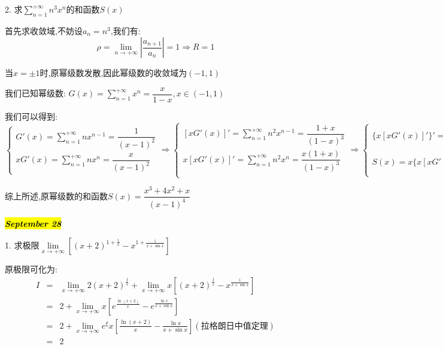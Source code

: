 2. 求$\sum\limits_{n=1}^{+\infty}n^3x^n$的和函数$S(x)$
\begin{solution}

	首先求收敛域,不妨设$a_{n}=n^3$,我们有:  
	$$\rho=\lim\limits_{n\rightarrow +\infty}|\dfrac{a_{n+1}}{a_{n}}|=1\Rightarrow R=1$$
	
	当$x=\pm 1$时,原幂级数发散,因此幂级数的收敛域为$(-1,1)$
	
	我们已知幂级数:  $G(x)=\sum\limits_{n=1}^{+\infty}x^{n}=\dfrac{x}{1-x},x\in(-1,1)$
	
	我们可以得到:  
	$$\left\lbrace
	\begin{array}{l}
		G'(x)=\sum\limits_{n=1}^{+\infty}nx^{n-1}=\dfrac{1}{(x-1)^2}\\
		xG'(x)=\sum\limits_{n=1}^{+\infty}nx^{n}=\dfrac{x}{(x-1)^2}
	\end{array}
	\right.\Rightarrow \left\lbrace
	\begin{array}{l}
		[xG'(x)]'=\sum\limits_{n=1}^{+\infty}n^2x^{n-1}=\dfrac{1+x}{(1-x)^3}\\
		x[xG'(x)]'=\sum\limits_{n=1}^{+\infty}n^2x^{n}=\dfrac{x(1+x)}{(1-x)^3}\\
	\end{array}
	\right.\Rightarrow \left\lbrace
	\begin{array}{l}
		\{x[xG'(x)]'\}'=\sum\limits_{n=1}^{+\infty}n^3x^{n-1}=\dfrac{x^2+4x+1}{(x-1)^4}\\
		S(x)=x\{x[xG'(x)]'\}'=\dfrac{x^3+4x^2+x}{(x-1)^4}
	\end{array}
	\right. $$
	
	综上所述,原幂级数的和函数$S(x)=\dfrac{x^3+4x^2+x}{(x-1)^4}$
\end{solution}

\hl{\textbf{\textit{September 28}}}

1. 求极限$\lim\limits_{x\rightarrow +\infty}\left[(x+2)^{1+\frac{1}{x}}-x^{1+\frac{1}{x+\sin x}}\right]$
\begin{solution}

	原极限可化为:  
	\begin{eqnarray*}
		I&=&\lim\limits_{x\rightarrow +\infty}2(x+2)^{\frac{1}{x}}+\lim\limits_{x\rightarrow +\infty}x\left[(x+2)^{\frac{1}{x}}-x^{\frac{1}{x+\sin x}}\right]\\
		&=&2+\lim\limits_{x\rightarrow +\infty}x\left[e^{\frac{\ln(x+2)}{x}}-e^{\frac{\ln x}{x+\sin x}}\right]\\
		&=&2+\lim\limits_{x\rightarrow +\infty}e^{\xi}x[\frac{\ln(x+2)}{x}-\frac{\ln x}{x+\sin x}](\text{拉格朗日中值定理})\\
		&=&2
	\end{eqnarray*}
\end{solution}


